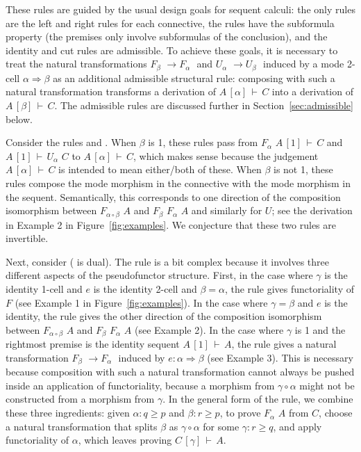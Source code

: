 \documentclass{drl-common/llncs}
\newcommand{\tc}[2]{\ensuremath{#1 \Rightarrow #2}}
\newcommand\compo[2]{\ensuremath{#1 \circ #2}}
\newcommand\F[2]{\ensuremath{F_{#1} \,\, #2}}
\newcommand\U[2]{\ensuremath{U_{#1} \,\, #2}}
\newcommand\seq[3]{\ensuremath{#1 \, [ #2 ] \, \vdash \, #3}}
\renewcommand\irl[1]{\dsd{#1}}
\begin{document}
These rules are guided by the usual design goals for sequent calculi:
the only rules are the left and right rules for each connective, the
rules have the subformula property (the premises only involve
subformulas of the conclusion), and the identity and cut rules are
admissible.  To achieve these goals, it is necessary to treat the
natural transformations $\F{\beta}{} \to \F{\alpha}{}$ and $\U{\alpha}{}
\to \U{\beta}{}$ induced by a mode 2-cell $\tc{\alpha}{\beta}$ as an
additional admissible structural rule: composing with such a natural
transformation transforms a derivation of \seq{A}{\alpha}{C} into a
derivation of \seq{A}{\beta}{C}.  The admissible rules are discussed
further in Section~\ref{sec:admissible} below.  

Consider the rules \irl{FL} and \irl{UR}.  When $\beta$ is 1, these
rules pass from \seq{\F {\alpha}{A}}{1}{C} and \seq{A}{1}{\U{\alpha}{C}}
to \seq{A}{\alpha}{C}, which makes sense because the judgement
\seq{A}{\alpha}{C} is intended to mean either/both of these.  When
$\beta$ is not 1, these rules compose the mode morphism in the
connective with the mode morphism in the sequent.  Semantically, this
corresponds to one direction of the composition isomorphism between
$\F{\compo{\alpha}{\beta}}{A}$ and $\F{\beta}{\F{{\alpha}}{A}}$ and
similarly for $U$; see the derivation in Example 2 in
Figure~\ref{fig:examples}.  We conjecture that these two rules are
invertible.

Next, consider \irl{FR} (\irl{UL} is dual).  The rule is a bit complex
because it involves three different aspects of the pseudofunctor
structure.  First, in the case where $\gamma$ is the identity 1-cell and
$e$ is the identity 2-cell and $\beta = \alpha$, the rule gives
functoriality of $F$ (see Example 1 in Figure~\ref{fig:examples}).  In
the case where $\gamma = \beta$ and $e$ is the identity, the rule gives
the other direction of the composition isomorphism between
$\F{\compo{\alpha}{\beta}}{A}$ and $\F{\beta}{\F{{\alpha}}{A}}$ (see
Example 2).  In the case where $\gamma$ is 1 and the rightmost premise
is the identity sequent \seq{A}{1}{A}, the rule gives a natural
transformation $\F{\beta}{} \to \F{\alpha}{}$ induced by $e :
\tc{\alpha}{\beta}$ (see Example 3).  This is necessary because
composition with such a natural transformation cannot always be pushed
inside an application of functoriality, because a morphism from
$\compo{\gamma}{\alpha}$ might not be constructed from a morphism from
$\gamma$.  In the general form of the rule, we combine these three
ingredients: given $\alpha : q \ge p$ and $\beta : r \ge p$, to prove
\F{\alpha}{A} from $C$, choose a natural transformation that splits
$\beta$ as $\compo{\gamma}{\alpha}$ for some $\gamma : r \ge q$, and
apply functoriality of $\alpha$, which leaves proving
\seq{C}{\gamma}{A}.  
\end{document}

